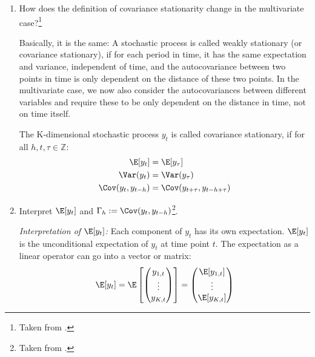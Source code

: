 \begin{enumerate}
    \item How does the definition of covariance stationarity change in the multivariate case?\footnote{Taken from \cite[][See section 16, "Understanding multivariate time series concepts"]{Mutschler-2018-github_repo}.}

          \begin{sol}
              Basically, it is the same: A stochastic process is called weakly stationary (or covariance stationary), if for each period in time, it has the same expectation and variance, independent of time, and the autocovariance between two points in time is only dependent on the distance of these two points. In the multivariate case, we now also consider the autocovariances between different variables and require these to be only dependent on the distance in time, not on time itself.

              \begin{definition}
                  The K-dimensional stochastic process $y_t$ is called covariance stationary, if for all $h,t,\tau \in \mathbb{Z}$:
                  \begin{align}
                      \E[{y_t}]
                       & = \E[{y_\tau}]
                      \\
                      \Var(y_t)
                       & = \Var(y_\tau)
                      \\
                      \Cov(y_{t},y_{t-h})
                       & = \Cov(y_{t+\tau}, y_{t-h+\tau})
                  \end{align}
              \end{definition}
          \end{sol}

    \item Interpret $\E[y_t]$ and $\Gamma_h := \Cov(y_{t},y_{t-h})$\footnote{Taken from \cite[][See section 16, "Understanding multivariate time series concepts"]{Mutschler-2018-github_repo}.}.
          \begin{sol}
              \emph{Interpretation of $\E[y_t]$:} Each component of $y_t$ has its own expectation. $\E[y_t]$ is the unconditional expectation of $y_t$ at time point $t$. The expectation as a linear operator can go into a vector or matrix:
              \begin{align*}
                  \E[y_t]
                  = \E\left[
                      \begin{pmatrix}
                          y_{1,t} \cr \vdots \cr y_{K,t}
                      \end{pmatrix}
                      \right]
                  = \begin{pmatrix}
                        \E[y_{1,t}] \cr \vdots \cr \E[y_{K,t}]
                    \end{pmatrix}
              \end{align*}



\end{sol}
\end{enumerate}
